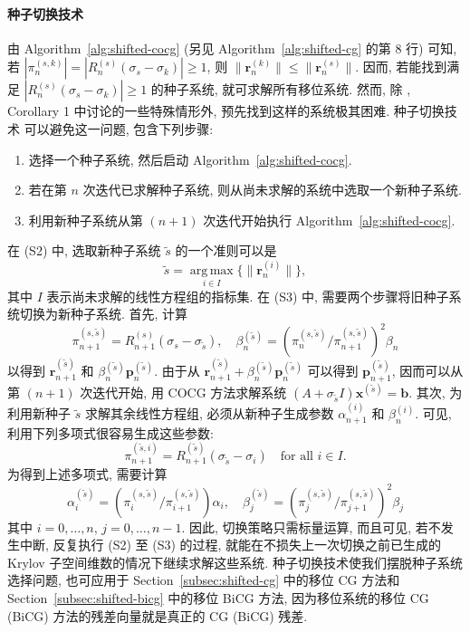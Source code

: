 \paragraph{{种子切换技术}}\label{subsubsec:seed-switching}\label{srcpage:printed-173}\mbox{}\par
{由 Algorithm\ \ref{alg:shifted-cocg} (另见 Algorithm\ \ref{alg:shifted-cg} 的第 8 行) 可知, 若 $|\pi_n^{(s,k)}|=|R_n^{(s)}(\sigma_s-\sigma_k)|\ge1$, 则 $\|\bm r_n^{(k)}\|\le\|\bm r_n^{(s)}\|$. 因而, 若能找到满足 $|R_n^{(s)}(\sigma_s-\sigma_k)|\ge1$ 的种子系统, 就可求解所有移位系统. 然而, 除 , Corollary 1 中讨论的一些特殊情形外, 预先找到这样的系统极其困难. 种子切换技术  可以避免这一问题, 包含下列步骤:}
\begin{enumerate}[label=(S\arabic*)]
\item {选择一个种子系统, 然后启动 Algorithm\ \ref{alg:shifted-cocg}.}
\item {若在第 $n$ 次迭代已求解种子系统, 则从尚未求解的系统中选取一个新种子系统.}
\item {利用新种子系统从第 $(n+1)$ 次迭代开始执行 Algorithm\ \ref{alg:shifted-cocg}.}
\end{enumerate}
{在 (S2) 中, 选取新种子系统 $\widetilde s$ 的一个准则可以是}
\[\widetilde s=\operatorname*{arg\,max}_{i\in I}\{\|\bm r_n^{(i)}\|\},\]
{其中 $I$ 表示尚未求解的线性方程组的指标集. 在 (S3) 中, 需要两个步骤将旧种子系统切换为新种子系统. 首先, 计算}
\[\pi_{n+1}^{(s,\widetilde s)}=R_{n+1}^{(s)}(\sigma_s-\sigma_{\widetilde s}),\quad\beta_n^{(\widetilde s)}=\left(\pi_n^{(s,\widetilde s)}/\pi_{n+1}^{(s,\widetilde s)}\right)^2\beta_n\]
{以得到 $\bm r_{n+1}^{(\widetilde s)}$ 和 $\beta_n^{(\widetilde s)}\bm p_n^{(\widetilde s)}$. 由于从 $\bm r_{n+1}^{(\widetilde s)}+\beta_n^{(\widetilde s)}\bm p_n^{(\widetilde s)}$ 可以得到 $\bm p_{n+1}^{(\widetilde s)}$, 因而可以从第 $(n+1)$ 次迭代开始, 用 COCG 方法求解系统 $(A+\sigma_{\widetilde s}I)\bm x^{(\widetilde s)}=\bm b$. 其次, 为利用新种子 $\widetilde s$ 求解其余线性方程组, 必须从新种子生成参数 $\alpha_{n+1}^{(i)}$ 和 $\beta_n^{(i)}$. 可见, 利用下列多项式很容易生成这些参数:}
\[\pi_{n+1}^{(\widetilde s,i)}=R_{n+1}^{(\widetilde s)}(\sigma_{\widetilde s}-\sigma_i)\quad\text{for all }i\in I.\]
{为得到上述多项式, 需要计算}
\[\alpha_i^{(\widetilde s)}=\left(\pi_i^{(s,\widetilde s)}/\pi_{i+1}^{(s,\widetilde s)}\right)\alpha_i,\quad\beta_j^{(\widetilde s)}=\left(\pi_j^{(s,\widetilde s)}/\pi_{j+1}^{(s,\widetilde s)}\right)^2\beta_j\]
{其中 $i=0,\ldots,n$, $j=0,\ldots,n-1$. 因此, 切换策略只需标量运算, 而且可见, 若不发生中断, 反复执行 (S2) 至 (S3) 的过程, 就能在不损失上一次切换之前已生成的 Krylov 子空间维数的情况下继续求解这些系统. 种子切换技术使我们摆脱种子系统选择问题, 也可应用于 Section\ \ref{subsec:shifted-cg} 中的移位 CG 方法和 Section\ \ref{subsec:shifted-bicg} 中的移位 BiCG 方法, 因为移位系统的移位 CG (BiCG) 方法的残差向量就是真正的 CG (BiCG) 残差.}

